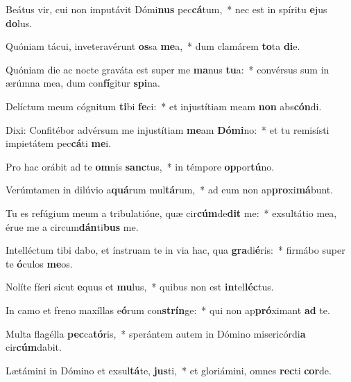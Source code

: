 \item Beátus vir, cui non imputávit Dómi\textbf{nus} pec\textbf{cá}tum,~* nec est in spíritu \textbf{e}jus \textbf{do}lus.
\item Quóniam tácui, inveteravérunt \textbf{os}sa \textbf{me}a,~* dum clamárem \textbf{to}ta \textbf{di}e.
\item Quóniam die ac nocte graváta est super me \textbf{ma}nus \textbf{tu}a:~* convérsus sum in ærúmna mea, dum con\textbf{fí}gitur \textbf{spi}na.
\item Delíctum meum cógnitum \textbf{ti}bi \textbf{fe}ci:~* et injustítiam meam \textbf{non} abs\textbf{cón}di.
\item Dixi: Confitébor advérsum me injustítiam \textbf{me}am \textbf{Dó}\textbf{mi}no:~* et tu remisísti impietátem pec\textbf{cá}ti \textbf{me}i.
\item Pro hac orábit ad te \textbf{om}nis \textbf{sanc}tus,~* in témpore \textbf{op}por\textbf{tú}no.
\item Verúmtamen in dilúvio a\textbf{quá}rum mul\textbf{tá}rum,~* ad eum non ap\textbf{pro}xi\textbf{má}bunt.
\item Tu es refúgium meum a tribulatióne, quæ cir\textbf{cúm}de\textbf{dit} me:~* exsultátio mea, érue me a circum\textbf{dán}ti\textbf{bus} me.
\item Intelléctum tibi dabo, et ínstruam te in via hac, qua \textbf{gra}di\textbf{é}ris:~* firmábo super te \textbf{ó}culos \textbf{me}os.
\item Nolíte fíeri sicut \textbf{e}quus et \textbf{mu}lus,~* quibus non est \textbf{in}tel\textbf{léc}tus.
\item In camo et freno maxíllas e\textbf{ó}rum con\textbf{strín}ge:~* qui non ap\textbf{pró}ximant \textbf{ad} te.
\item Multa flagélla \textbf{pec}ca\textbf{tó}ris,~* sperántem autem in Dómino misericórdi\textbf{a} cir\textbf{cúm}dabit.
\item Lætámini in Dómino et exsul\textbf{tá}te, \textbf{jus}ti,~* et gloriámini, omnes \textbf{rec}ti \textbf{cor}de.
